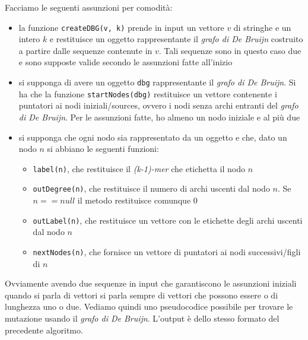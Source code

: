 \documentclass[a4paper,12pt, oneside]{book}
\begin{document}
Facciamo le seguenti assunzioni per comodità:
\begin{itemize}
  \item la funzione \texttt{createDBG(v, k)} prende in input un vettore $v$ di
  stringhe e un intero $k$ e restituisce un oggetto rappresentante il
  \textit{grafo di De Bruijn} costruito a  
  partire dalle sequenze contenute in $v$. Tali sequenze sono in questo caso due
  e sono supposte valide secondo le assunzioni fatte all'inizio
  \item si supponga di avere un oggetto \texttt{dbg} rappresentante il
  \textit{grafo di De Bruijn}. Si ha che la funzione \texttt{startNodes(dbg)}
  restituisce un vettore contenente i puntatori ai nodi iniziali/sources, ovvero
  i nodi 
  senza archi entranti del \textit{grafo di De Bruijn}. Per le assunzioni fatte,
  ho almeno un nodo iniziale e al più due
  \item si supponga che ogni nodo sia rappresentato da un oggetto e che, dato un
  nodo $n$ si abbiano le seguenti funzioni:
  \begin{itemize}
    \item \texttt{label(n)}, che restituisce il \textit{(k-1)-mer} che
    etichetta il nodo $n$
    \item \texttt{outDegree(n)}, che restituisce il numero di archi uscenti dal
    nodo $n$. Se $n==null$ il metodo restituisce comunque 0
    \item \texttt{outLabel(n)}, che restituisce un vettore con le etichette
    degli archi uscenti dal nodo $n$
    \item \texttt{nextNodes(n)}, che fornisce un vettore di puntatori ai nodi
    successivi/figli di $n$
 \end{itemize}
\end{itemize}
Ovviamente avendo due sequenze in input che garantiscono le assunzioni iniziali
quando si parla di vettori si parla sempre di vettori che possono essere o di
lunghezza uno o due.
\newpage
Vediamo quindi uno pseudocodice possibile per trovare le mutazione usando il
\textit{grafo di De Bruijn}. L'output è dello stesso formato del precedente
algoritmo. 
\end{document}
